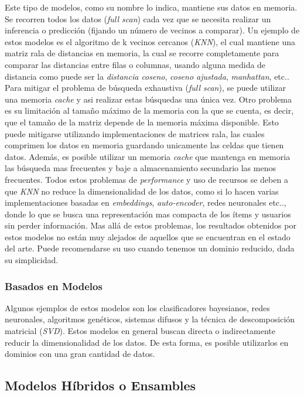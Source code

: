 \documentclass[11pt,a4paper,twoside]{thesis}
\begin{document}
Este tipo de modelos, como su nombre lo indica, mantiene sus datos en memoria.
Se recorren todos los datos (\textit{full scan}) cada vez que se necesita
realizar un inferencia o predicción (fijando un número de vecinos a comparar).
Un ejemplo de estos modelos es el algoritmo de k vecinos cercanos
(\textit{KNN}), el cual mantiene una matriz rala de distancias en memoria, la
cual se recorre completamente para comparar las distancias entre filas o
columnas, usando alguna medida de distancia como puede ser la \textit{distancia
	coseno}, \textit{coseno ajustada}, \textit{manhattan}, etc.. Para mitigar el
problema de búsqueda exhaustiva (\textit{full scan}), se puede utilizar una
memoria \textit{cache} y asi realizar estas búsquedas una única vez. Otro
problema es su limitación al tamaño máximo de la memoria con la que se cuenta,
es decir, que el tamaño de la matriz depende de la memoria máxima disponible.
Esto puede mitigarse utilizando implementaciones de matrices rala, las cuales
comprimen los datos en memoria guardando unicamente las celdas que tienen
datos. Además, es posible utilizar un memoria \textit{cache} que mantenga en
memoria las búsqueda mas frecuentes y baje a almacenamiento secundario las
menos frecuentes. Todos estos problemas de \textit{performance} y uso de
recursos se deben a que \textit{KNN} no reduce la dimensionalidad de los datos,
como si lo hacen varias implementaciones basadas en \textit{embeddings},
\textit{auto-encoder}, redes neuronales etc.., donde lo que se busca una
representación mas compacta de los ítems y usuarios sin perder información. Mas
allá de estos problemas, los resultados obtenidos por estos modelos no están
muy alejados de aquellos que se encuentran en el estado del arte. Puede
recomendarse su uso cuando tenemos un dominio reducido, dada su simplicidad.

\subsubsection{Basados en Modelos}

Algunos ejemplos de estos modelos son los clasificadores bayesianos, redes
neuronales, algoritmos genéticos, sistemas difusos y la técnica de
descomposición matricial (\textit{SVD}). Estos modelos en general buscan
directa o indirectamente reducir la dimensionalidad de los datos. De esta
forma, es posible utilizarlos en dominios con una gran cantidad de datos.

\clearpage
\subsection{Modelos Híbridos o Ensambles}
\end{document}
